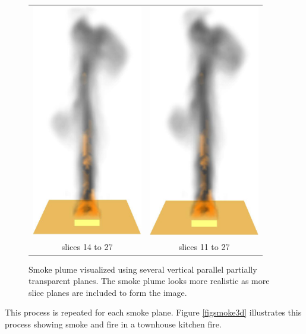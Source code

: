 \begin{figure}[\figoptions]
\begin{center}
\begin{tabular}{cc}
\includegraphics[height=4.0in]{figures/splume_14_27}&
\includegraphics[height=4.0in]{figures/splume_11_27}\\
slices 14 to 27&slices 11 to 27
\end{tabular}
\end{center}
\caption [Smoke plume visualized using several vertical parallel
partially transparent planes.] {Smoke plume visualized using
several vertical parallel partially transparent planes. The smoke
plume looks more realistic as more slice planes
are included to form the image. } \label{figplume}
\end{figure}

\noindent This process is repeated for each smoke plane. Figure
\ref{figsmoke3d} illustrates this process showing smoke and fire
in a townhouse kitchen fire.

